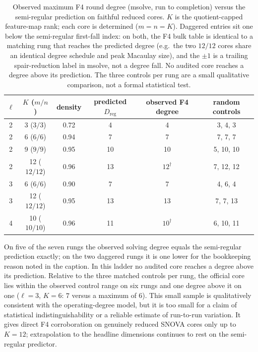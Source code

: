 \documentclass[11pt]{article}
\newcommand{\SNOVA}{\textsf{SNOVA}}
\begin{document}
\begin{table}[t]
\centering
\caption{Observed maximum F4 round degree (msolve, run to completion) versus the
semi-regular prediction on faithful reduced cores.  $K$ is the quotient-capped
feature-map rank; each core is determined ($m=n=K$).  Daggered entries sit one
below the semi-regular first-fall index: on both, the F4 bulk table is identical
to a matching rung that reaches the predicted degree (e.g.\ the two $12/12$
cores share an identical degree schedule and peak Macaulay size), and the $\pm1$
is a trailing spair-reduction label in msolve, not a degree fall.  No audited
core reaches a degree above its prediction.  The three controls per rung are a
small qualitative comparison, not a formal statistical test.}
\label{tab:ladder}
\begin{tabular}{cccccc}
\toprule
$\ell$ & $K$ ($m/n$) & density & predicted $D_\mathrm{reg}$ & observed F4 degree & random controls \\
\midrule
2 & 3 ($3/3$)    & 0.72 & 4  & 4              & 3, 4, 3   \\
2 & 6 ($6/6$)    & 0.94 & 7  & 7              & 7, 7, 7   \\
2 & 9 ($9/9$)    & 0.95 & 10 & 10             & 5, 10, 10 \\
2 & 12 ($12/12$) & 0.96 & 13 & $12^{\dagger}$ & 7, 12, 12 \\
3 & 6 ($6/6$)    & 0.90 & 7  & 7              & 4, 6, 4   \\
3 & 12 ($12/12$) & 0.95 & 13 & 13             & 7, 7, 13  \\
4 & 10 ($10/10$) & 0.96 & 11 & $10^{\dagger}$ & 6, 10, 11 \\
\bottomrule
\end{tabular}
\end{table}

On five of the seven rungs the observed solving degree equals the semi-regular
prediction exactly; on the two daggered rungs it is one lower for the
bookkeeping reason noted in the caption.  In this ladder no audited core reaches
a degree above its prediction.  Relative to the three matched controls per
rung, the official core lies within the observed control range on six rungs and
one degree above it on one ($\ell=3$, $K=6$: $7$ versus a maximum of $6$).
This small sample is qualitatively consistent with the operating-degree model,
but it is too small for a claim of statistical indistinguishability or a
reliable estimate of run-to-run variation.  It gives direct F4 corroboration on
genuinely reduced \SNOVA{} cores only up to $K=12$; extrapolation to the
headline dimensions continues to rest on the semi-regular predictor.
\end{document}
